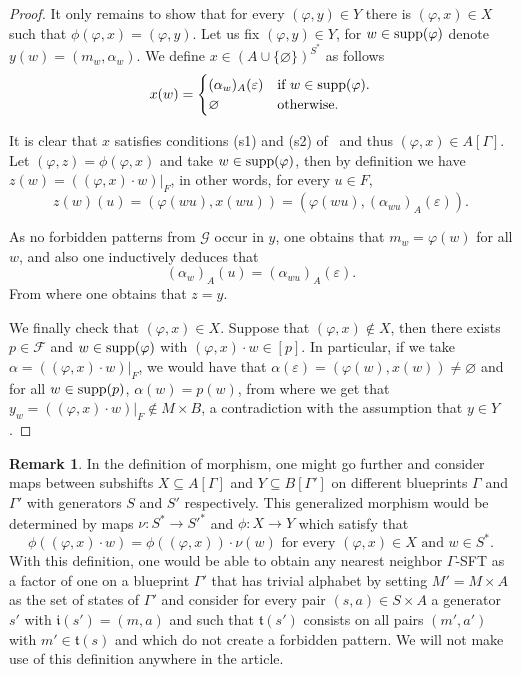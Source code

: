 \documentclass{article}
\theoremstyle{definition}
\newtheorem{remark}[theorem]{Remark}
\theoremstyle{definition}
\newcommand{\FF}{\mathcal{F}}
\newcommand{\init}{\mathfrak{i}}
\newcommand{\ter}{\mathfrak{t}}
\newcommand{\supp}{\textnormal{supp}}
\begin{document}
\begin{proof}
 It only remains to show that for every $(\varphi,y) \in Y$ there is $(\varphi,x) \in X$ such that $\phi(\varphi,x)=(\varphi,y)$.  Let us fix $(\varphi,y) \in Y$, for $w\in \supp(\varphi)$ denote $y(w)=(m_w,\alpha_w)$. We define $x\in (A\cup \{\varnothing\})^{S^*}$ as follows \[ x(w) = \begin{cases}
   (\alpha_w)_A(\varepsilon)   & \mbox{if } w \in \supp(\varphi).\\
     \varnothing & \mbox{otherwise}.
 \end{cases}  \]

 It is clear that $x$ satisfies conditions (s1) and (s2) of~ and thus $(\varphi,x)\in A[\Gamma]$. Let $(\varphi,z)=\phi(\varphi,x)$ and take $w \in \supp(\varphi)$, then by definition we have $z(w) = ((\varphi,x)\cdot w)|_{F}$, in other words, for every $u \in F$, \[z(w)(u) = (\varphi(wu),  x(wu)) = (\varphi(wu),  (\alpha_{wu})_A(\varepsilon)). \]

 As no forbidden patterns from $\mathcal{G}$ occur in $y$, one obtains that $m_w = \varphi(w)$ for all $w$, and also one inductively deduces that \[ (\alpha_{w})_A(u) = (\alpha_{wu})_A(\varepsilon). \]
 From where one obtains that $z = y$. 

 We finally check that $(\varphi,x) \in X$. Suppose that $(\varphi,x)\notin X$, then there exists $p \in \FF$ and $w \in \supp(\varphi)$ with $(\varphi,x)\cdot w \in [p]$. In particular, if we take $\alpha = ((\varphi,x)\cdot w)|_F$, we would have that $\alpha(\varepsilon)=(\varphi(w),x(w))\neq \varnothing$ and for all $w \in \supp(p)$, $\alpha(w)=p(w)$, from where we get that $y_w = ((\varphi,x)\cdot w)|_F \notin M \times B$, a contradiction with the assumption that $y \in Y$.\end{proof}

 
 \begin{remark}
     In the definition of morphism, one might go further and consider maps between subshifts $X\subseteq A[\Gamma]$ and $Y\subseteq B[\Gamma']$ on different blueprints $\Gamma$ and $\Gamma'$ with generators $S$ and $S'$ respectively. This generalized morphism would be determined by maps $\nu \colon S^* \to S'^*$ and 
     $\phi\colon X \to Y$ which satisfy that \[ \phi((\varphi,x)\cdot w) = \phi((\varphi,x))\cdot \nu(w) \mbox{ for every } (\varphi,x) \in X \mbox{ and } w\in S^*.   \]
     With this definition, one would be able to obtain any nearest neighbor $\Gamma$-SFT as a factor of one on a blueprint $\Gamma'$ that has trivial alphabet by setting $M' = M \times A$ as the set of states of $\Gamma'$ and consider for every pair $(s,a)\in S\times A$ a generator $s'$ with $\init(s')=(m,a)$ and such that $\ter(s')$ consists on all pairs $(m',a')$ with $m'\in \ter(s)$ and which do not create a forbidden pattern. We will not make use of this definition anywhere in the article.
 \end{remark}
\end{document}
